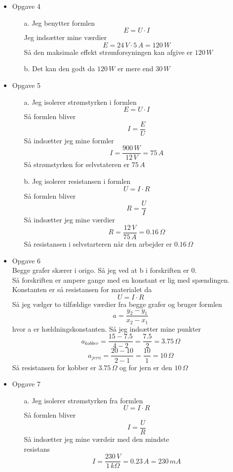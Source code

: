 \documentclass[12pt]{article}
\begin{document}
\begin{itemize}
  \item{Opgave 4}
  \begin{enumerate}
    \item[a.] Jeg benytter formlen
    $$
    E = U \cdot I
    $$
    Jeg indsætter mine værdier
    $$
    E = 24\, V \cdot 5\, A = 120\, W
    $$
    Så den maksimale effekt strømforsyningen kan afgive er $120\, W$\\

    \item[b.] Det kan den godt da $120\, W$ er mere end $30\, W$\\
  \end{enumerate}

  \item{Opgave 5}
  \begin{enumerate}
    \item[a.] Jeg isolerer strømstyrken i formlen
    $$
    E = U \cdot I
    $$
    Så formlen bliver
    $$
    I = \frac{E}{U}
    $$
    Så indsætter jeg mine formler
    $$
    I = \frac{900\, W}{12\, V} = 75\, A
    $$
    Så strømstyrken for selvstateren er $75\, A$\\

    \item[b.] Jeg isolerer resistansen i formlen
    $$
    U = I \cdot R
    $$
    Så formlen bliver
    $$
    R = \frac{U}{I}
    $$
    Så indsætter jeg mine værdier
    $$
    R = \frac{12\, V}{75\, A} = 0.16\, \Omega
    $$
    Så resistansen i selvstarteren når den arbejder er $0.16\, \Omega$\\
  \end{enumerate}

  \item{Opgave 6}\\
  Begge grafer skærer i origo. Så jeg ved at b i forskriften er 0.\\
  Så forskriften er ampere gange med en konstant er lig med spændingen. Konstanten er så resistansen for materialet da
  $$
  U = I \cdot R
  $$
  Så jeg vælger to tilfældige værdier fra begge grafer og bruger formlen
  $$
  a = \frac{y_2 - y_1}{x_2 - x_1}
  $$
  hvor a er hældningskonstanten. Så jeg indsætter mine punkter
  $$
  a_{kobber} = \frac{15-7.5}{4-2} = \frac{7.5}{2} = 3.75\, \Omega
  $$
  $$
  a_{jern} = \frac{20-10}{2-1} = \frac{10}{1} = 10\, \Omega
  $$
  Så resistansen for kobber er $3.75\, \Omega$ og for jern er den $10\, \Omega$\\

  \item{Opgave 7}
  \begin{enumerate}
    \item[a.] Jeg isolerer strømstyrken fra formlen
    $$
    U = I \cdot R
    $$
    Så formlen bliver
    $$
    I = \frac{U}{R}
    $$
    Så indsætter jeg mine værdeir med den mindste\\ resistans
    $$
    I = \frac{230\, V}{1\, k\Omega} = 0.23\, A = 230\, mA
    $$\\


\end{enumerate}
\end{itemize}
\end{document}
